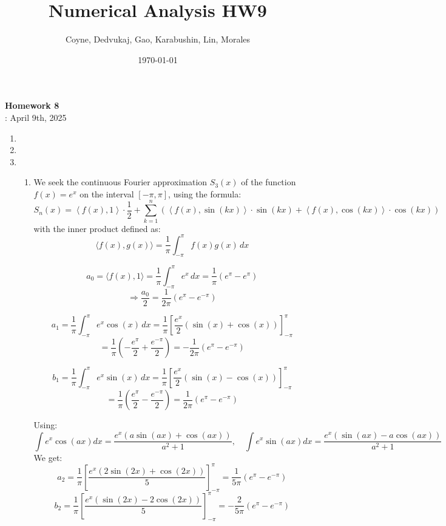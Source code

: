 \documentclass[12pt]{article}
\title{Numerical Analysis HW9}
\author{Coyne, Dedvukaj, Gao, Karabushin, Lin, Morales}
\date{\today}
\begin{document}
\pagestyle{fancy}


\begin{center}
\textbf{\Large Homework 8} \\
: April 9th, 2025
\end{center}

\begin{enumerate}[leftmargin=0em]
    \item 

    \item 

    \item
    \begin{enumerate}[leftmargin=!]
        \item
        We seek the continuous Fourier approximation \( S_3(x) \) of the function \( f(x) = e^x \) on the interval \( [-\pi, \pi] \), using the formula:
        \[S_n(x) = \left\langle f(x), 1 \right\rangle \cdot \frac{1}{2} + \sum_{k=1}^{n} \left( \left\langle f(x), \sin(kx) \right\rangle \cdot \sin(kx) + \left\langle f(x), \cos(kx) \right\rangle \cdot \cos(kx) \right)\]
        with the inner product defined as:
        \[\langle f(x), g(x) \rangle = \frac{1}{\pi} \int_{-\pi}^{\pi} f(x) g(x) \, dx\]

        \[a_0 = \langle f(x), 1 \rangle = \frac{1}{\pi} \int_{-\pi}^{\pi} e^x \, dx = \frac{1}{\pi} (e^{\pi} - e^{\pi})\]
        \[\Rightarrow \frac{a_0}{2} = \frac{1}{2\pi}(e^{\pi} - e^{-\pi})\]

        \[a_1 = \frac{1}{\pi} \int_{-\pi}^{\pi} e^x \cos(x) \, dx = \frac{1}{\pi} \left[ \frac{e^x}{2} (\sin(x) +\cos(x)) \right]_{-\pi}^{\pi}\]
        \[= \frac{1}{\pi} \left( -\frac{e^{\pi}}{2} + \frac{e^{-\pi}}{2} \right) = -\frac{1}{2\pi}(e^{\pi} - e^{-\pi})\]

        \[b_1 = \frac{1}{\pi} \int_{-\pi}^{\pi} e^x \sin(x) \, dx = \frac{1}{\pi} \left[ \frac{e^x}{2} (\sin(x) - \cos(x)) \right]_{-\pi}^{\pi}\]
        \[= \frac{1}{\pi} \left( \frac{e^{\pi}}{2} - \frac{e^{-\pi}}{2} \right) = \frac{1}{2\pi}(e^{\pi} - e^{-\pi})\]

        Using:
        \[\int e^x \cos(ax) dx = \frac{e^x (a \sin(ax) + \cos(ax))}{a^2 + 1}, \quad\int e^x \sin(ax) dx = \frac{e^x (\sin(ax) - a \cos(ax))}{a^2 + 1}\]
        We get:
        \[a_2 = \frac{1}{\pi} \left[ \frac{e^x (2 \sin(2x) + \cos(2x))}{5} \right]_{-\pi}^{\pi}= \frac{1}{5\pi}(e^{\pi} - e^{-\pi})\]
        \[b_2 = \frac{1}{\pi} \left[ \frac{e^x (\sin(2x) - 2 \cos(2x))}{5} \right]_{-\pi}^{\pi}= -\frac{2}{5\pi}(e^{\pi} - e^{-\pi})\]


\end{enumerate}
\end{enumerate}
\end{document}
